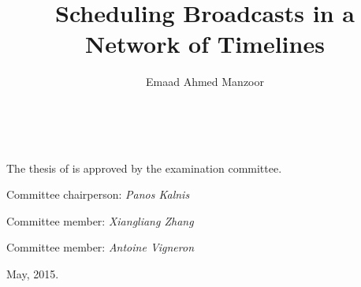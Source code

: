 \documentclass[onesided,asymmetric]{tufte-book}
\title{Scheduling Broadcasts in a Network of Timelines}
\author[Emaad Ahmed Manzoor]{Emaad Ahmed Manzoor}
\newcommand{\openepigraph}[2]{%
  \begin{fullwidth}
  \sffamily\large
  \begin{doublespace}
  \noindent\allcaps{#1}\\%
  \noindent\allcaps{#2}%
  \end{doublespace}
  \end{fullwidth}
}
\newcommand{\blankpage}{\newpage\hbox{}\thispagestyle{empty}\newpage}
\begin{document}
\let\cleardoublepage\clearpage

\frontmatter




\maketitle


\setlength{\parindent}{0pt}
\setlength{\parskip}{\baselineskip}

\chapter[Examination Committee Approval]{}
\thispagestyle{fancy}
\begin{fullwidth}
~\vfill

The thesis of \textit{\thanklessauthor} is approved by the examination committee.

Committee chairperson: \textit{Panos Kalnis}\hfill\underline{\hspace{10pc}}

Committee member: \textit{Xiangliang Zhang}\hfill\underline{\hspace{10pc}}

Committee member: \textit{Antoine Vigneron}\hfill\underline{\hspace{10pc}}

May, 2015.

\end{fullwidth}
\end{document}
